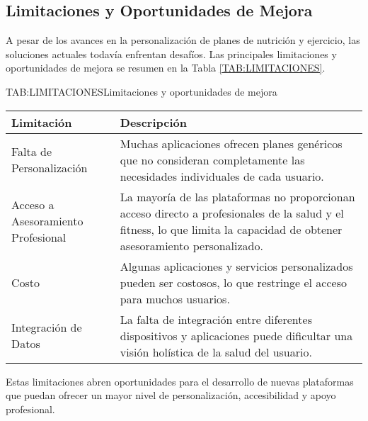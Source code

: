 \subsection{Limitaciones y Oportunidades de Mejora}

A pesar de los avances en la personalización de planes de nutrición y ejercicio, las soluciones actuales todavía enfrentan desafíos. Las principales limitaciones y oportunidades de mejora se resumen en la Tabla \ref{TAB:LIMITACIONES}.

\begin{table}[Limitaciones y Oportunidades de Mejora]{TAB:LIMITACIONES}{Limitaciones y oportunidades de mejora}
  \begin{tabular}{|p{5cm}|p{8cm}|}
    \hline
    \textbf{Limitación} & \textbf{Descripción} \\
    \hline
    Falta de Personalización & Muchas aplicaciones ofrecen planes genéricos que no consideran completamente las necesidades individuales de cada usuario. \\
    \hline
    Acceso a Asesoramiento Profesional & La mayoría de las plataformas no proporcionan acceso directo a profesionales de la salud y el fitness, lo que limita la capacidad de obtener asesoramiento personalizado. \\
    \hline
    Costo & Algunas aplicaciones y servicios personalizados pueden ser costosos, lo que restringe el acceso para muchos usuarios. \\
    \hline
    Integración de Datos & La falta de integración entre diferentes dispositivos y aplicaciones puede dificultar una visión holística de la salud del usuario. \\
    \hline
  \end{tabular}
\end{table}

Estas limitaciones abren oportunidades para el desarrollo de nuevas plataformas que puedan ofrecer un mayor nivel de personalización, accesibilidad y apoyo profesional.
